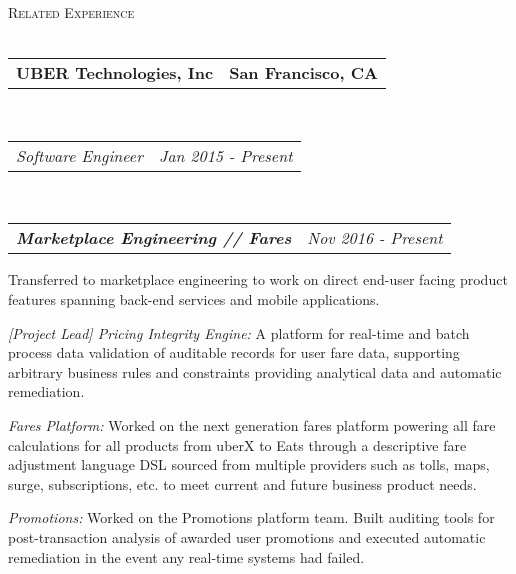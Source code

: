 \documentclass[10pt,letterpaper]{article}
\makeatletter
\newcommand{\area}[2]{\emph{#1:}   #2}
\newcommand{\lineunder}{\vspace*{-8pt} \\ \hspace*{-18pt} \hrulefill \\}
\newcommand{\header}[1]{{\hspace*{-15pt}\vspace*{6pt} \textsc{#1}} \vspace*{-6pt} \lineunder}
\newcommand{\subemployment}[3]{
	\headerrow
  {\hspace{8pt}\textbf{\emph{#1}}}
		{\emph{#2}}
  \vspace*{-15pt}
\begin{itemize*}
\item #3 
\end{itemize*}
}
\newcommand{\headerrow}[2]
{\begin{tabular*}{\linewidth}{l@{\extracolsep{\fill}}r}
	#1 &
	#2 \\
\end{tabular*}}
\newcommand{\employmentNoList}[5]{
	\headerrow
		{\textbf{#1}}
		{\textbf{#2}}
	\\
	\headerrow
		{\emph{#3}}
		{\emph{#4}}
	#5
}
\makeatother
\begin{document}
\header{Related Experience}
\employmentNoList{UBER Technologies, Inc}{San Francisco, CA}{Software Engineer}{Jan 2015 - Present}{
  \\
 \subemployment{Marketplace Engineering // Fares}{Nov 2016 - Present}{
 Transferred to marketplace engineering to work on direct end-user facing
 product features spanning back-end services and mobile applications. 
\item \area{[Project Lead] Pricing Integrity Engine}{A platform for real-time
    and batch process data validation of auditable records for user fare data, supporting
    arbitrary business rules and constraints providing analytical data and
    automatic remediation.}
\item \area{Fares Platform}{Worked on the next generation fares platform
    powering all fare calculations for all products from uberX to Eats through
    a descriptive fare adjustment language DSL sourced from multiple providers
    such as tolls, maps, surge, subscriptions, etc. to meet current and future
    business product needs.}
\item \area{Promotions}{Worked on the Promotions platform team. Built auditing
    tools for post-transaction analysis of awarded user promotions and executed
    automatic remediation in the event any real-time systems had failed.}
}

}
\end{document}
